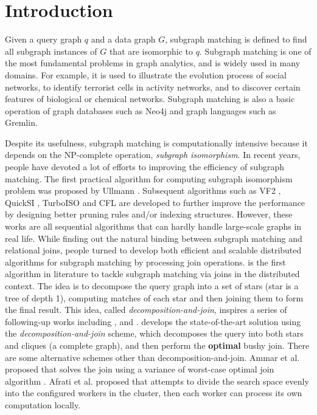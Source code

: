 \section{Introduction}
\label{sec:intro}
Given a query graph $q$ and a data graph $G$, subgraph matching is defined to find all subgraph instances of $G$ that are isomorphic to $q$. Subgraph matching is one of the most fundamental problems in graph analytics, and is widely used in many domains. For example, it is used to illustrate the evolution process of social networks\cite{kairam2012life}, to identify terrorist cells in activity networks\cite{cook2006mining}, and to discover certain features of biological or chemical networks\cite{Cannataro2010}. Subgraph matching is also a basic operation of graph databases such as Neo4j\cite{neo4j} and graph languages such as Gremlin\cite{gremlin}.

 Despite its usefulness, subgraph matching is computationally intensive because it depends on the NP-complete operation, \textit{subgraph isomorphism}\cite{Shamir97}. In recent years, people have devoted a lot of efforts to improving the efficiency of subgraph matching. The first practical algorithm for computing subgraph isomorphism problem was proposed by Ullmann \cite{Ullmann1976}. Subsequent algorithms such as VF2 \cite{cordella2004sub}, QuickSI \cite{Shang2008}, TurboISO \cite{turbo-iso} and CFL\cite{bi-fei} are developed to further improve the performance by designing better pruning rules and/or indexing structures. However, these works are all sequential algorithms that can hardly handle large-scale graphs in real life. While finding out the natural binding between subgraph matching and relational joins, people turned to develop both efficient and scalable distributed algorithms for subgraph matching by processing join operations. \starjoin \cite{star-join} is the first algorithm in literature to tackle subgraph matching via joins in the distributed context. The idea is to decompose the query graph into a set of stars (star is a tree of depth 1), computing matches of each star and then joining them to form the final result. This idea, called \textit{decomposition-and-join}, inspires a series of following-up works including \psgl \cite{Shao2014}, \ttjoin \cite{Lai2015} and \cliquejoin \cite{Lai2016}. \cliquejoin develops the state-of-the-art solution using the \textit{decomposition-and-join} scheme, which decomposes the query into both stars and cliques (a complete graph), and then perform the \textbf{optimal} bushy join. There are some alternative schemes other than decomposition-and-join. Ammar et al. proposed \bigjoin \cite{Ammar2018} that solves the join using a variance of worst-case optimal join algorithm \cite{generic-join}. Afrati et al. proposed \multiwayjoin \cite{AfratiFU13} that attempts to divide the search space evenly into the configured workers in the cluster, then each worker can process its own computation locally. 

